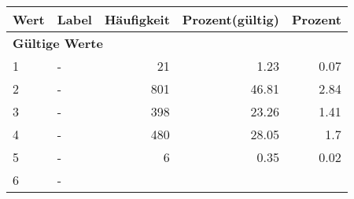      \begin{longtable}{lXrrr}
     \toprule
     \textbf{Wert} & \textbf{Label} & \textbf{Häufigkeit} & \textbf{Prozent(gültig)} & \textbf{Prozent} \\
     \endhead
     \midrule
     \multicolumn{5}{l}{\textbf{Gültige Werte}}\\

     1 &
     \multicolumn{1}{X}{ -  } &


       \num{21} &
       \num[round-mode=places,round-precision=2]{1.23} &
         \num[round-mode=places,round-precision=2]{0.07} \\

     2 &
     \multicolumn{1}{X}{ -  } &


       \num{801} &
       \num[round-mode=places,round-precision=2]{46.81} &
         \num[round-mode=places,round-precision=2]{2.84} \\

     3 &
     \multicolumn{1}{X}{ -  } &


       \num{398} &
       \num[round-mode=places,round-precision=2]{23.26} &
         \num[round-mode=places,round-precision=2]{1.41} \\

     4 &
     \multicolumn{1}{X}{ -  } &


       \num{480} &
       \num[round-mode=places,round-precision=2]{28.05} &
         \num[round-mode=places,round-precision=2]{1.7} \\

     5 &
     \multicolumn{1}{X}{ -  } &


       \num{6} &
       \num[round-mode=places,round-precision=2]{0.35} &
         \num[round-mode=places,round-precision=2]{0.02} \\

     6 &
     \multicolumn{1}{X}{ -  } &



\end{longtable}
